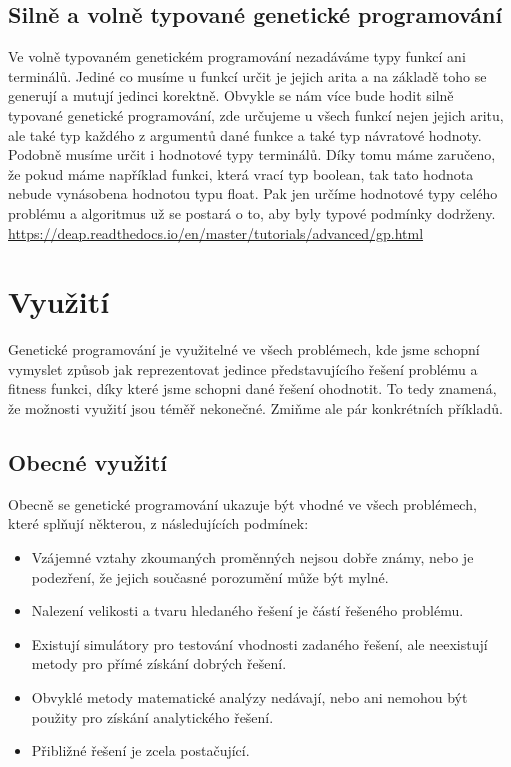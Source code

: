 \subsection{Silně a volně typované genetické programování}
Ve volně typovaném genetickém programování nezadáváme typy funkcí ani terminálů. Jediné co musíme u funkcí určit je jejich arita a na základě toho se generují a mutují jedinci korektně.
Obvykle se nám více bude hodit silně typované genetické programování, zde určujeme u všech funkcí nejen jejich aritu, ale také typ každého z argumentů dané funkce a také typ návratové hodnoty.
Podobně musíme určit i hodnotové typy terminálů. Díky tomu máme zaručeno, že pokud máme například funkci, která vrací typ boolean, tak tato hodnota nebude vynásobena hodnotou typu float. 
Pak jen určíme hodnotové typy celého problému a algoritmus už se postará o to, aby byly typové podmínky dodrženy.
\url{https://deap.readthedocs.io/en/master/tutorials/advanced/gp.html}

\section{Využití}
Genetické programování je využitelné ve všech problémech, kde jsme schopní vymyslet způsob jak reprezentovat jedince představujícího řešení problému a fitness funkci, díky které jsme schopni dané řešení ohodnotit.
To tedy znamená, že možnosti využití jsou téměř nekonečné. Zmiňme ale pár konkrétních příkladů. 

\subsection{Obecné využití}
Obecně se genetické programování ukazuje být vhodné ve všech problémech, které splňují některou, z následujících podmínek:

\begin{itemize}
    \item Vzájemné vztahy zkoumaných proměnných nejsou dobře známy, nebo je podezření, že jejich současné porozumění může být mylné.
    \item Nalezení velikosti a tvaru hledaného řešení je částí řešeného problému.
    \item Existují simulátory pro testování vhodnosti zadaného řešení, ale neexistují metody pro přímé získání dobrých řešení.
    \item Obvyklé metody matematické analýzy nedávají, nebo ani nemohou být použity pro získání analytického řešení.
    \item Přibližné řešení je zcela postačující.
    
\end{itemize}


